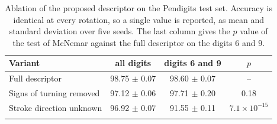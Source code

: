 \begin{table}[t]
\caption{Ablation of the proposed descriptor on the Pendigits test set. Accuracy
is identical at every rotation, so a single value is reported, as mean and
standard deviation over five seeds. The last column gives the $p$ value of the
test of McNemar against the full descriptor on the digits $6$ and $9$.}
\label{tab:abl}
\begin{tabular}{lccc}
\toprule
Variant & all digits & digits 6 and 9 & $p$\\
\midrule
Full descriptor & 98.75 $\pm$ 0.07 & 98.60 $\pm$ 0.07 & --\\
Signs of turning removed & 97.12 $\pm$ 0.06 & 97.71 $\pm$ 0.20 & 0.18\\
Stroke direction unknown & 96.92 $\pm$ 0.07 & 91.55 $\pm$ 0.11 & $7.1\times10^{-15}$\\
\botrule
\end{tabular}
\end{table}
